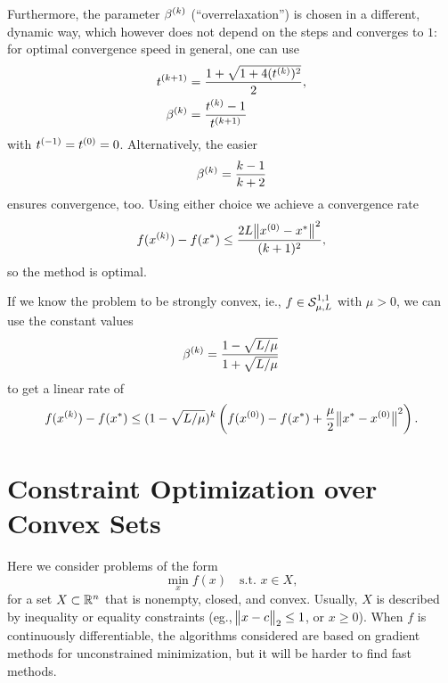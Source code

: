 \documentclass{article}
\begin{document}
Furthermore, the parameter \(\kth{\beta}\) (``overrelaxation'') is chosen in a different, dynamic
way, which however does not depend on the steps and converges to \(1\): for optimal convergence
speed in general, one can use
\begin{align*}
  \kth[k+1]{t} &= \frac{1 + \sqrt{1 + 4(\kth{t})^2}}{2}, \\
  \kth{\beta} &= \frac{\kth{t} - 1}{\kth[k+1]{t}}
\end{align*}
with \(\kth[-1]{t} = \kth[0]{t} = 0\).  Alternatively, the easier
\begin{equation*}
  \kth{\beta} = \frac{k - 1}{k + 2}
\end{equation*}
ensures convergence, too. Using either choice we achieve a convergence rate
\begin{equation*}
  f(\kth{x}) - f(x^*) \leq \frac{2L\enVert[1]{\kth[0]{x} - x^*}^2}{(k + 1)^2},
\end{equation*}
so the method is optimal.

If we know the problem to be strongly convex, ie., \(f \in \Strong{\mu}{L}{1}{1}\) with \(\mu > 0\),
we can use the constant values
\begin{equation*}
  \kth{\beta} = \frac{1 - \sqrt{L/\mu}}{1 + \sqrt{L/\mu}}
\end{equation*}
to get a linear rate of
\begin{equation*}
  f(\kth{x}) - f(x^*) \leq (1 - \sqrt{L/\mu})^k
    \left( f(\kth[0]{x}) - f(x^*) + \frac{\mu}{2} \enVert[1]{x^* - \kth[0]{x}}^2 \right).
\end{equation*}


\section{Constraint Optimization over Convex Sets}

\label{s:constrained-optimization-basics}

Here we consider problems of the form
\begin{equation*}
  \min_{x} f(x) \quad \text{s.t. } x \in X,
\end{equation*}
for a set \(X \subset \RR^n\) that is nonempty, closed, and convex.  Usually, \(X\) is described by
inequality or equality constraints (eg., \(\enVert[1]{x - c}_2 \leq 1\), or \(x \geq 0\)).  When
\(f\) is continuously differentiable, the algorithms considered are based on gradient methods for
unconstrained minimization, but it will be harder to find fast methods.
\end{document}
